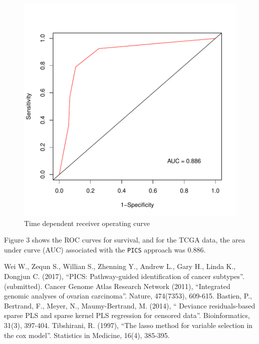 \documentclass[11pt]{article}
\begin{document}
\begin{figure}[tbh]
\begin{center}
\includegraphics{PICS-example-plot3}
\caption{Time dependent receiver operating curve}
\end{center}
\end{figure}

Figure 3 shows the ROC curves for survival, and for the TCGA data, the area under curve (AUC) associated with the \texttt{PICS} approach was 0.886.


\begin{thebibliography}{99}
 Wei W., Zequn S., Willian S., Zhenning Y., Andrew L., Gary H., Linda K., Dongjun C. (2017), ``PICS: Pathway-guided identification of cancer subtypes''. (submitted).
 Cancer Genome Atlas Research Network (2011), ``Integrated genomic analyses of ovarian carcinoma''. Nature, 474(7353), 609-615.
 Bastien, P., Bertrand, F., Meyer, N., Maumy-Bertrand, M. (2014), `` Deviance residuals-based sparse PLS and sparse kernel PLS regression for censored data''. Bioinformatics, 31(3), 397-404.
 Tibshirani, R. (1997), ``The lasso method for variable selection in the cox model''. Statistics in Medicine, 16(4), 385-395.

\end{thebibliography}
\end{document}
